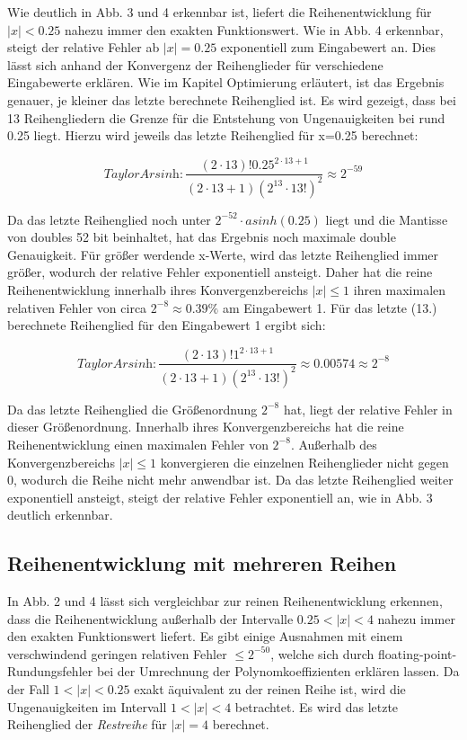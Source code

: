 \documentclass[course=erap] {aspdoc}
\begin{document}
    Wie deutlich in Abb. 3 und 4 erkennbar ist, liefert die Reihenentwicklung für $|x|<0.25$ nahezu immer den exakten Funktionswert.
    Wie in Abb. 4 erkennbar, steigt der relative Fehler ab $|x| = 0.25$ exponentiell zum Eingabewert an.
    Dies lässt sich anhand der Konvergenz der Reihenglieder für verschiedene Eingabewerte erklären.
    Wie im Kapitel Optimierung erläutert, ist das Ergebnis genauer, je kleiner das letzte berechnete Reihenglied ist.
    Es wird gezeigt, dass bei 13 Reihengliedern die Grenze für die Entstehung von Ungenauigkeiten bei rund 0.25 liegt.
    Hierzu wird jeweils das letzte Reihenglied für x=0.25 berechnet:

    \[
        \textit{TaylorArsinh}: \frac{(2\cdot13)!0.25^{2\cdot13 + 1}}{(2\cdot13 + 1)(2^{13}\cdot13!)^2} \approx 2^{-59}
    \]

    Da das letzte Reihenglied noch unter $2^{-52}\cdot asinh(0.25)$ liegt und die Mantisse von doubles 52 bit beinhaltet, hat das Ergebnis noch maximale double Genauigkeit.
    Für größer werdende x-Werte, wird das letzte Reihenglied immer größer, wodurch der relative Fehler exponentiell ansteigt.
    Daher hat die reine Reihenentwicklung innerhalb ihres Konvergenzbereichs $|x|\leq1$ ihren maximalen relativen Fehler von circa $2^{-8} \approx 0.39\%$ am Eingabewert 1.
    Für das letzte (13.) berechnete Reihenglied für den Eingabewert 1 ergibt sich:

    \[
        \textit{TaylorArsinh}: \frac{(2\cdot13)!1^{2\cdot13 + 1}}{(2\cdot13 + 1)(2^{13}\cdot13!)^2} \approx 0.00574 \approx 2^{-8}
    \]

    Da das letzte Reihenglied die Größenordnung $2^{-8}$ hat, liegt der relative Fehler in dieser Größenordnung.
    Innerhalb ihres Konvergenzbereichs hat die reine Reihenentwicklung einen maximalen Fehler von $2^{-8}$.
    Außerhalb des Konvergenzbereichs $|x|\leq1$ konvergieren die einzelnen Reihenglieder nicht gegen 0, wodurch die Reihe nicht mehr anwendbar ist.
    Da das letzte Reihenglied weiter exponentiell ansteigt, steigt der relative Fehler exponentiell an, wie in Abb. 3 deutlich erkennbar.

    \subsection{Reihenentwicklung mit mehreren Reihen}\label{subsec:reihenentwicklung-mit-mehreren-reihen}

    In Abb. 2 und 4 lässt sich vergleichbar zur reinen Reihenentwicklung erkennen, dass die Reihenentwicklung außerhalb der Intervalle $0.25<|x|<4$ nahezu immer den exakten Funktionswert liefert.
    Es gibt einige Ausnahmen mit einem verschwindend geringen relativen Fehler $\leq2^{-50}$, welche sich durch floating-point-Rundungsfehler bei der Umrechnung der Polynomkoeffizienten erklären lassen.
    Da der Fall $1<|x|<0.25$ exakt äquivalent zu der reinen Reihe ist, wird die Ungenauigkeiten im Intervall $1<|x|<4$ betrachtet.
    Es wird das letzte Reihenglied der \textit{Restreihe} für $|x|=4$ berechnet.
\end{document}
